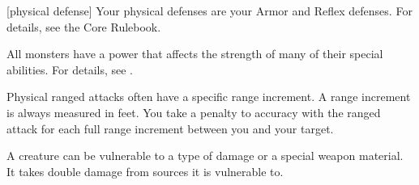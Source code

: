 [physical defense] Your physical defenses are your Armor and Reflex defenses.
For details, see the Core Rulebook.

 All monsters have a power that affects the strength of many of their special abilities.
For details, see .

 Physical ranged attacks often have a specific range increment.
A range increment is always measured in feet.
You take a  penalty to accuracy with the ranged attack for each full range increment between you and your target.

 A creature can be vulnerable to a type of damage or a special weapon material.
It takes double damage from sources it is vulnerable to.
